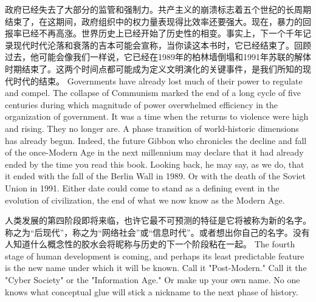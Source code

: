 \begin{paracol}{2}
\switchcolumn*
政府已经失去了大部分的监管和强制力。共产主义的崩溃标志着五个世纪的长周期结束了，在这期间，政府组织中的权力量表现得比效率还要强大。现在，暴力的回报率已经不再高涨。世界历史上已经开始了历史性的相变。事实上，下一个千年记录现代时代沦落和衰落的吉本可能会宣称，当你读这本书时，它已经结束了。回顾过去，他可能会像我们一样说，它已经在1989年的柏林墙倒塌和1991年苏联的解体时期结束了。这两个时间点都可能成为定义文明演化的关键事件，是我们所知的现代时代的结束。
\switchcolumn
Governments have already lost much of their power to regulate and compel. The collapse of Communism marked the end of a long cycle of five centuries during which magnitude of power overwhelmed efficiency in the organization of government. It was a time when the returns to violence were high and rising. They no longer are. A phase transition of world-historic dimensions has already begun. Indeed, the future Gibbon who chronicles the decline and fall of the once-Modern Age in the next millennium may declare that it had already ended by the time you read this book. Looking back, he may say, as we do, that it ended with the fall of the Berlin Wall in 1989. Or with the death of the Soviet Union in 1991. Either date could come to stand as a defining event in the evolution of civilization, the end of what we now know as the Modern Age.

\switchcolumn*
人类发展的第四阶段即将来临，也许它最不可预测的特征是它将被称为新的名字。称之为“后现代”，称之为“网络社会”或“信息时代”。或者想出你自己的名字。没有人知道什么概念性的胶水会将昵称与历史的下一个阶段粘在一起。
\switchcolumn
The fourth stage of human development is coming, and perhaps its least predictable feature is the new name under which it will be known. Call it "Post-Modern." Call it the "Cyber Society" or the "Information Age." Or make up your own name. No one knows what conceptual glue will stick a nickname to the next phase of history.
  

\end{paracol}
